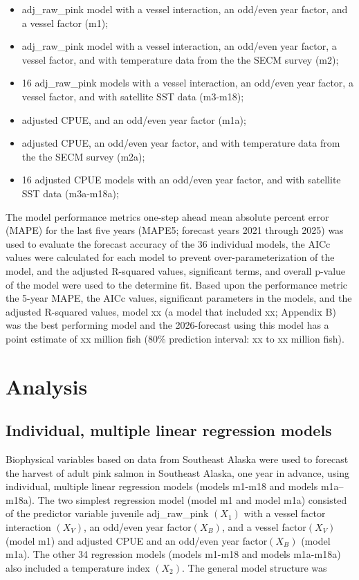 \documentclass[
  letterpaper,
  DIV=11,
  numbers=noendperiod]{scrartcl}
\begin{document}
\begin{itemize}
\item
  adj\_raw\_pink model with a vessel interaction, an odd/even year
  factor, and a vessel factor (m1);
\item
  adj\_raw\_pink model with a vessel interaction, an odd/even year
  factor, a vessel factor, and with temperature data from the the SECM
  survey (m2);
\item
  16 adj\_raw\_pink models with a vessel interaction, an odd/even year
  factor, a vessel factor, and with satellite SST data (m3-m18);
\item
  adjusted CPUE, and an odd/even year factor (m1a);
\item
  adjusted CPUE, an odd/even year factor, and with temperature data from
  the the SECM survey (m2a);
\item
  16 adjusted CPUE models with an odd/even year factor, and with
  satellite SST data (m3a-m18a);
\end{itemize}

The model performance metrics one-step ahead mean absolute percent error
(MAPE) for the last five years (MAPE5; forecast years 2021 through 2025)
was used to evaluate the forecast accuracy of the 36 individual models,
the AICc values were calculated for each model to prevent
over-parameterization of the model, and the adjusted R-squared values,
significant terms, and overall p-value of the model were used to the
determine fit. Based upon the performance metric the 5-year MAPE, the
AICc values, significant parameters in the models, and the adjusted
R-squared values, model xx (a model that included xx; Appendix B) was
the best performing model and the 2026-forecast using this model has a
point estimate of xx million fish (80\% prediction interval: xx to xx
million fish).

\section{Analysis}\label{analysis}

\subsection{Individual, multiple linear regression
models}\label{individual-multiple-linear-regression-models}

Biophysical variables based on data from Southeast Alaska were used to
forecast the harvest of adult pink salmon in Southeast Alaska, one year
in advance, using individual, multiple linear regression models (models
m1-m18 and models m1a--m18a). The two simplest regression model (model
m1 and model m1a) consisted of the predictor variable juvenile
adj\_raw\_pink \(({X_1})\) with a vessel factor interaction \(({X_V})\),
an odd/even year factor\(({X_B})\), and a vessel factor\(({X_V})\)
(model m1) and adjusted CPUE and an odd/even year factor\(({X_B})\)
(model m1a). The other 34 regression models (models m1-m18 and models
m1a-m18a) also included a temperature index \(({X_2})\). The general
model structure was
\end{document}
